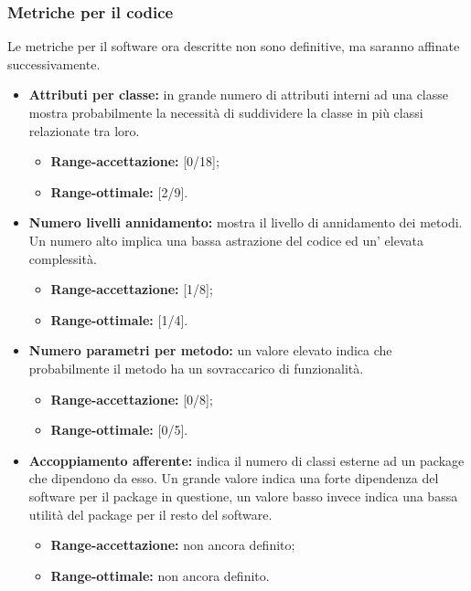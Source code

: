 		
		\subsubsection{Metriche per il codice}
		Le metriche per il software ora descritte non sono definitive, ma saranno affinate successivamente.
		
		\begin{itemize}
			\item \textbf{Attributi per classe: }in grande numero di attributi interni ad una classe mostra probabilmente la necessità di suddividere la classe in più classi relazionate tra loro.
			
			\begin{itemize}
				\item \textbf{Range-accettazione: }[0/18];
				\item \textbf{Range-ottimale: }[2/9].
			\end{itemize}
		
			\item \textbf{Numero livelli annidamento: }mostra il livello di annidamento dei metodi. Un numero alto implica una bassa astrazione del codice ed un' elevata complessità.
			
			\begin{itemize}
				\item \textbf{Range-accettazione: }[1/8];
				\item \textbf{Range-ottimale: }[1/4].
			\end{itemize}
			
			\item \textbf{Numero parametri per metodo: }un valore elevato indica che probabilmente il metodo ha un sovraccarico di funzionalità.
			
			\begin{itemize}
				\item \textbf{Range-accettazione: }[0/8];
				\item \textbf{Range-ottimale: }[0/5].
			\end{itemize}
			
			\item \textbf{Accoppiamento afferente: }indica il numero di classi esterne ad un package che dipendono da esso. Un grande valore indica una forte dipendenza del software per il package in questione, un valore basso invece indica una bassa utilità del package per il resto del software.
			
			\begin{itemize}
				\item \textbf{Range-accettazione: }non ancora definito;
				\item \textbf{Range-ottimale: }non ancora definito.
			\end{itemize}
			

\end{itemize}
